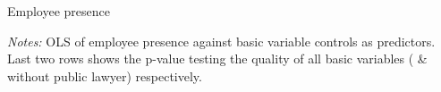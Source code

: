 \documentclass[9pt]{beamer}
\begin{document}
\begin{frame}{Employee presence}
\begin{table}[H]
    \label{pactor_reg}
    \begin{center}
    \scriptsize{}
    \end{center}
    \scriptsize
    \textit{Notes:} OLS of employee presence against basic variable controls as predictors. Last two rows shows the p-value testing the quality of all basic variables ( \& without public lawyer) respectively.
\end{table}
\end{frame}
\end{document}
